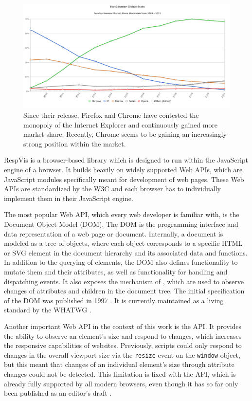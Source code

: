 \begin{figure}[tp]
\centering
\includegraphics[keepaspectratio,width=\linewidth,height=\fullh / 3]{diagrams/browser-market-share.pdf}
\caption[Desktop Browser Market Share]{
  Since their release, Firefox and Chrome have contested the monopoly of the Internet Explorer and continuously gained more market share. 
  Recently, Chrome seems to be gaining an increasingly strong position within the market. 
  }
\label{fig:BrowserMarketShare}
\end{figure}


RespVis is a browser-based library which is designed to run within the
JavaScript engine of a browser. It builds heavily on widely supported
Web APIs, which are JavaScript modules specifically meant for
development of web pages. These Web APIs are standardized by the W3C
and each browser has to individually implement them in their
JavaScript engine.

The most popular Web API, which every web developer is familiar with,
is the Document Object Model (DOM). The DOM is the programming
interface and data representation of a web page or document.
Internally, a document is modeled as a tree of objects, where each
object corresponds to a specific HTML or SVG element in the document
hierarchy and its associated data and functions. In addition to the
querying of elements, the DOM also defines functionality to mutate
them and their attributes, as well as functionality for handling and
dispatching events. It also exposes the mechanism of
, which are used to observe changes of
attributes and children in the document tree. The initial
specification of the DOM was published in 1997 \parencite{DOM1}. It
is currently maintained as a living standard by the WHATWG
\parencite{DOM}.

Another important Web API in the context of this work is the
 API. It provides the ability to observe an
element's size and respond to changes, which increases the responsive
capabilities of websites. Previously, scripts could only respond to
changes in the overall viewport size via the \lstinline{resize} event
on the \lstinline{window} object, but this meant that changes of an
individual element's size through attribute changes could not be
detected. This limitation is fixed with the 
API, which is already fully supported by all modern browsers, even
though it has so far only been published as an editor's draft
\parencite{ResizeObserver}.






